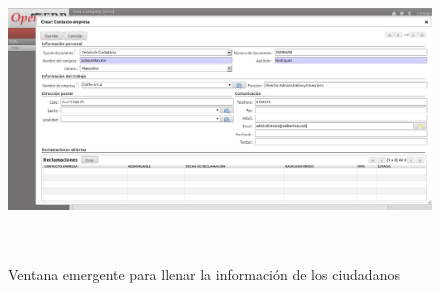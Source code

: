 \begin{itemize}
\begin{enumerate}
  \begin{figure}[H]
  \centering
  \includegraphics[width=17cm,height=8cm]{./Imagenes/formusuario.png}
  \caption{Ventana emergente para llenar la información de los ciudadanos}
  \label{fig:formusuario}
  \end{figure}


\end{enumerate}
\end{itemize}
